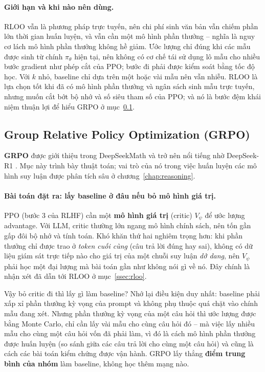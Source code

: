 \paragraph{Giới hạn và khi nào nên dùng.}
RLOO vẫn là phương pháp trực tuyến, nên chi phí sinh văn bản vẫn chiếm phần lớn thời gian huấn luyện, và vẫn cần một mô hình phần thưởng -- nghĩa là nguy cơ lách mô hình phần thưởng không hề giảm. Ước lượng chỉ đúng khi các mẫu được sinh từ chính \( \pi_{\theta} \) hiện tại, nên không có cơ chế tái sử dụng lô mẫu cho nhiều bước gradient như phép cắt của PPO; bước đi phải được kiểm soát bằng tốc độ học. Với \( k \) nhỏ, baseline chỉ dựa trên một hoặc vài mẫu nên vẫn nhiễu. RLOO là lựa chọn tốt khi đã có mô hình phần thưởng và ngân sách sinh mẫu trực tuyến, nhưng muốn cắt bớt bộ nhớ và số siêu tham số của PPO; và nó là bước đệm khái niệm thuận lợi để hiểu GRPO ở mục~\ref{ssec:grpo}.


\subsection{Group Relative Policy Optimization (GRPO)}
\label{ssec:grpo}

\textbf{GRPO} được giới thiệu trong DeepSeekMath \cite{shao2024deepseekmath} và trở nên nổi tiếng nhờ DeepSeek-R1 \cite{deepseekai2025r1}. Mục này trình bày thuật toán; vai trò của nó trong việc huấn luyện các mô hình suy luận được phân tích sâu ở chương~\ref{chap:reasoning}.

\paragraph{Bài toán đặt ra: lấy baseline ở đâu nếu bỏ mô hình giá trị.}
PPO (bước 3 của RLHF) cần một \textbf{mô hình giá trị} (critic) $V_\psi$ để ước lượng advantage. Với LLM, critic thường lớn ngang mô hình chính sách, nên tốn gần gấp đôi bộ nhớ và tính toán. Khó khăn thứ hai nghiêm trọng hơn: khi phần thưởng chỉ được trao ở \emph{token cuối cùng} (câu trả lời đúng hay sai), không có dữ liệu giám sát trực tiếp nào cho giá trị của một chuỗi suy luận \emph{dở dang}, nên $V_\psi$ phải học một đại lượng mà bài toán gần như không nói gì về nó. Đây chính là nhận xét đã dẫn tới RLOO ở mục~\ref{ssec:rloo}.

Vậy bỏ critic đi thì lấy gì làm baseline? Nhớ lại điều kiện duy nhất: baseline phải xấp xỉ phần thưởng kỳ vọng của prompt và không phụ thuộc quá chặt vào chính mẫu đang xét. Nhưng phần thưởng kỳ vọng của một câu hỏi thì ước lượng được bằng Monte Carlo, chỉ cần lấy vài mẫu cho cùng câu hỏi đó -- mà việc lấy nhiều mẫu cho cùng một câu hỏi vốn đã phải làm, vì đó là cách mô hình phần thưởng được huấn luyện (so sánh giữa các câu trả lời cho cùng một câu hỏi) và cũng là cách các bài toán kiểm chứng được vận hành. GRPO \cite{shao2024deepseekmath} lấy thẳng \textbf{điểm trung bình của nhóm} làm baseline, không học thêm mạng nào.

